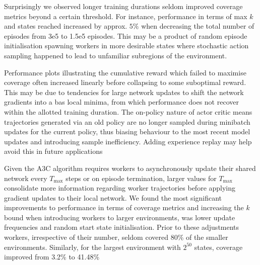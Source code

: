 \documentclass[runningheads]{llncs}
\begin{document}
Surprisingly we observed longer training durations seldom improved coverage metrics beyond a certain threshold. For instance, performance in terms of max $k$ and states reached increased by approx. $5\%$ when decreasing the total number of episodes from 3e5 to 1.5e5 episodes. This may be a product of random episode initialisation spawning workers in more desirable states where stochastic action sampling happened to lead to unfamiliar subregions of the environment. 

Performance plots illustrating the cumulative reward  which failed to maximise coverage often increased linearly before collapsing to some suboptimal reward. This may be due to tendencies for large network updates to shift the network gradients into a bas local minima, from which performance does not recover within the allotted training duration. The on-policy nature of actor critic means trajectories generated via an old policy are no longer sampled during minibatch updates for the current policy,  thus biasing behaviour to the most recent model updates and introducing sample inefficiency. Adding experience replay \cite{wang2017sample} may help avoid this in future applications

Given the A3C algorithm requires workers to asynchronously update their shared network every $T_{\max}$ steps or on episode termination, larger values for $T_{\max}$ consolidate more information regarding worker trajectories before applying gradient updates to their local network. We found the most significant improvements to performance in terms of coverage metrics and increasing the $k$ bound when introducing workers to larger environments, was lower update frequencies and random start state initialisation. Prior to these adjustments workers, irrespective of their number, seldom covered 80\% of the smaller environments. Similarly, for the largest environment with $2^{50}$ states, coverage improved from 3.2\% to 41.48\%
\end{document}
